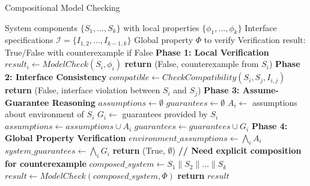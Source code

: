 \begin{algorithm}[htbp]
\caption{Compositional Model Checking}
\label{alg:compositional_verification}
\begin{algorithmic}[1]
\REQUIRE System components $\{S_1, ..., S_k\}$ with local properties $\{\phi_1, ..., \phi_k\}$
\REQUIRE Interface specifications $\mathcal{I} = \{I_{1,2}, ..., I_{k-1,k}\}$
\REQUIRE Global property $\Phi$ to verify
\ENSURE Verification result: True/False with counterexample if False
\STATE \textbf{Phase 1: Local Verification}
    \STATE $result_i \gets ModelCheck(S_i, \phi_i)$
        \STATE \textbf{return} (False, counterexample from $S_i$)
    \ENDIF
\ENDFOR
\STATE \textbf{Phase 2: Interface Consistency}
    \STATE $compatible \gets CheckCompatibility(S_i, S_j, I_{i,j})$
        \STATE \textbf{return} (False, interface violation between $S_i$ and $S_j$)
    \ENDIF
\ENDFOR
\STATE \textbf{Phase 3: Assume-Guarantee Reasoning}
\STATE $assumptions \gets \emptyset$
\STATE $guarantees \gets \emptyset$
    \STATE $A_i \gets$ assumptions about environment of $S_i$
    \STATE $G_i \gets$ guarantees provided by $S_i$
    \STATE $assumptions \gets assumptions \cup A_i$
    \STATE $guarantees \gets guarantees \cup G_i$
\ENDFOR
\STATE \textbf{Phase 4: Global Property Verification}
\STATE $environment\_assumptions \gets \bigwedge_i A_i$
\STATE $system\_guarantees \gets \bigwedge_i G_i$
    \STATE \textbf{return} (True, $\emptyset$)
\ELSE
    \STATE \textbf{// Need explicit composition for counterexample}
    \STATE $composed\_system \gets S_1 \parallel S_2 \parallel ... \parallel S_k$
    \STATE $result \gets ModelCheck(composed\_system, \Phi)$
    \STATE \textbf{return} $result$
\ENDIF
\end{algorithmic}
\end{algorithm}

